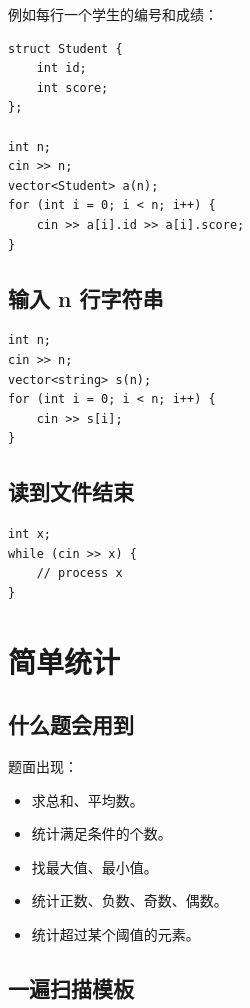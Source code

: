 例如每行一个学生的编号和成绩：

\begin{lstlisting}
struct Student {
    int id;
    int score;
};

int n;
cin >> n;
vector<Student> a(n);
for (int i = 0; i < n; i++) {
    cin >> a[i].id >> a[i].score;
}
\end{lstlisting}

\subsection{输入 n 行字符串}

\begin{lstlisting}
int n;
cin >> n;
vector<string> s(n);
for (int i = 0; i < n; i++) {
    cin >> s[i];
}
\end{lstlisting}

\subsection{读到文件结束}

\begin{lstlisting}
int x;
while (cin >> x) {
    // process x
}
\end{lstlisting}


\section{简单统计}\label{sec:05-8}

\subsection{什么题会用到}

题面出现：

\begin{itemize}
  \item 求总和、平均数。
  \item 统计满足条件的个数。
  \item 找最大值、最小值。
  \item 统计正数、负数、奇数、偶数。
  \item 统计超过某个阈值的元素。
\end{itemize}

\subsection{一遍扫描模板}


